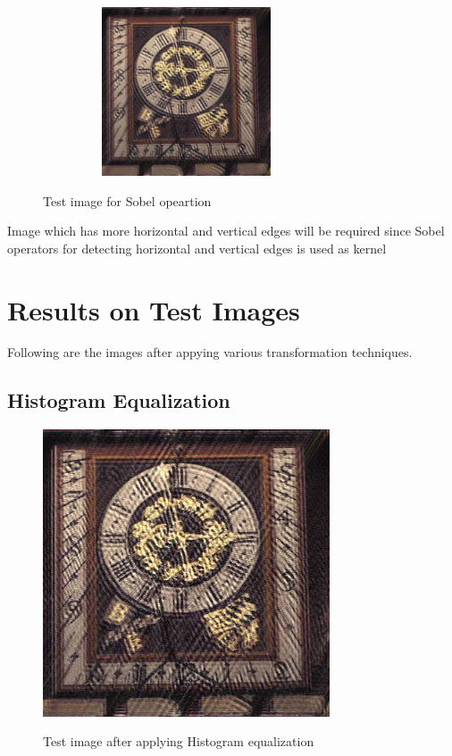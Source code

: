 \documentclass{article}
\begin{document}
\begin{figure}[htb]

\begin{minipage}[b]{1.0\linewidth}
  \centering
  \centerline{\includegraphics[width=8.5cm,height=5cm,keepaspectratio]{temp.jpg}}
  \centerline{Test image for Sobel opeartion\cite{WEBSITE:15}}\medskip
\end{minipage}
%
\end{figure}
Image which has more horizontal and vertical edges will be required since Sobel operators for detecting horizontal and vertical edges is used as kernel

\section{Results on Test Images}
\label{sec:print}

Following are the images after appying various transformation techniques.
\subsection{Histogram Equalization}
\begin{figure}[htb]

\begin{minipage}[b]{1.0\linewidth}
  \centering
  \centerline{\includegraphics[width=8.5cm]{temp.jpg}}
  \centerline{Test image after applying Histogram equalization}\medskip
\end{minipage}
%
\end{figure}
\end{document}
